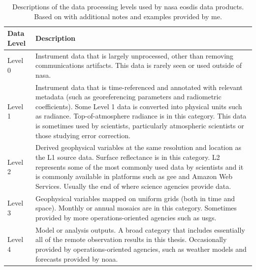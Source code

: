 \begin{table}[!htb]
\caption[NASA EOSDIS Data Processing Levels]{Descriptions of the data processing levels used by \ac{nasa} \ac{eosdis} data products. Based on \cite{earthsciencedatasystemsDataProcessingLevels2016} with additional notes and examples provided by me.}
\label{tab:data-processing-levels}
\begin{center}
\scriptsize
\begin{tabular}{ C{3cm}   L{8cm} } \hline
 
\textbf{Data Level} & \textbf{Description} \\ \hline

Level 0 & Instrument data that is largely unprocessed, other than removing communications artifacts. This data is rarely seen or used outside of \ac{nasa}. \\

Level 1 & Instrument data that is time-referenced and annotated with relevant metadata (such as georeferencing parameters and radiometric coefficients). Some Level 1 data is converted into physical units such as radiance. Top-of-atmosphere radiance is in this category. This data is sometimes used by scientists, particularly atmospheric scientists or those studying error correction. \\ 

Level 2 & Derived geophysical variables at the same resolution and location as the L1 source data. Surface reflectance is in this category. L2 represents some of the most commonly used data by scientists and it is commonly available in platforms such as \ac{gee} and Amazon Web Services. Usually the end of where science agencies provide data. \\

Level 3 & Geophysical variables mapped on uniform grids (both in time and space). Monthly or annual mosaics are in this category. Sometimes provided by more operations-oriented agencies such as \ac{usgs}. \\

Level 4 & Model or analysis outputs. A broad category that includes essentially all of the remote observation results in this thesis. Occasionally provided by operations-oriented agencies, such as weather models and forecasts provided by \ac{noaa}. \\ \hline

\end{tabular}
\end{center}
\end{table}


